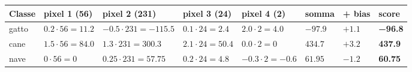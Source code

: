 \documentclass[11pt,a4paper,oneside,openany]{book}
\begin{document}
\begin{longtable}[]{@{}
  >{\raggedright\arraybackslash}p{}
  >{\raggedright\arraybackslash}p{}
  >{\raggedright\arraybackslash}p{}
  >{\raggedright\arraybackslash}p{}
  >{\raggedright\arraybackslash}p{}
  >{\raggedright\arraybackslash}p{}
  >{\raggedright\arraybackslash}p{}
  >{\raggedright\arraybackslash}p{}@{}}
\toprule\noalign{}
\begin{minipage}[b]{\linewidth}\raggedright
Classe
\end{minipage} & \begin{minipage}[b]{\linewidth}\raggedright
pixel 1 (56)
\end{minipage} & \begin{minipage}[b]{\linewidth}\raggedright
pixel 2 (231)
\end{minipage} & \begin{minipage}[b]{\linewidth}\raggedright
pixel 3 (24)
\end{minipage} & \begin{minipage}[b]{\linewidth}\raggedright
pixel 4 (2)
\end{minipage} & \begin{minipage}[b]{\linewidth}\raggedright
somma
\end{minipage} & \begin{minipage}[b]{\linewidth}\raggedright
+ bias
\end{minipage} & \begin{minipage}[b]{\linewidth}\raggedright
\textbf{score}
\end{minipage} \\
\midrule\noalign{}
\endhead
\bottomrule\noalign{}
\endlastfoot
gatto & \(0.2\cdot56 = 11.2\) & \(-0.5\cdot231 = -115.5\) & \(0.1\cdot24 = 2.4\) & \(2.0\cdot2 = 4.0\) & \(-97.9\) & \(+1.1\) & \textbf{−96.8} \\
cane & \(1.5\cdot56 = 84.0\) & \(1.3\cdot231 = 300.3\) & \(2.1\cdot24 = 50.4\) & \(0.0\cdot2 = 0\) & \(434.7\) & \(+3.2\) & \textbf{437.9} \\
nave & \(0\cdot56 = 0\) & \(0.25\cdot231 = 57.75\) & \(0.2\cdot24 = 4.8\) & \(-0.3\cdot2 = -0.6\) & \(61.95\) & \(-1.2\) & \textbf{60.75} \\
\end{longtable}
\end{document}
